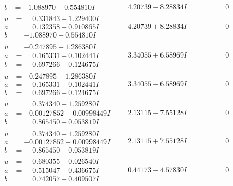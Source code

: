 \documentclass[1p]{elsarticle_modified}
\theoremstyle{definition}
\begin{document}
$$\begin{array}{c|c|c}
\begin{aligned}
b &= -1.088970 - 0.554810 I\end{aligned}
 & \phantom{-}4.20739 - 8.28834 I & \phantom{-0.000000 } 0 \\ \hline\begin{aligned}
u &= \phantom{-}0.331843 - 1.229400 I \\
a &= \phantom{-}0.132358 - 0.910865 I \\
b &= -1.088970 + 0.554810 I\end{aligned}
 & \phantom{-}4.20739 + 8.28834 I & \phantom{-0.000000 } 0 \\ \hline\begin{aligned}
u &= -0.247895 + 1.286380 I \\
a &= \phantom{-}0.165331 + 0.102441 I \\
b &= \phantom{-}0.697266 + 0.124675 I\end{aligned}
 & \phantom{-}3.34055 + 6.58969 I & \phantom{-0.000000 } 0 \\ \hline\begin{aligned}
u &= -0.247895 - 1.286380 I \\
a &= \phantom{-}0.165331 - 0.102441 I \\
b &= \phantom{-}0.697266 - 0.124675 I\end{aligned}
 & \phantom{-}3.34055 - 6.58969 I & \phantom{-0.000000 } 0 \\ \hline\begin{aligned}
u &= \phantom{-}0.374340 + 1.259280 I \\
a &= -0.00127852 + 0.00998449 I \\
b &= \phantom{-}0.865450 + 0.053819 I\end{aligned}
 & \phantom{-}2.13115 - 7.55128 I & \phantom{-0.000000 } 0 \\ \hline\begin{aligned}
u &= \phantom{-}0.374340 - 1.259280 I \\
a &= -0.00127852 - 0.00998449 I \\
b &= \phantom{-}0.865450 - 0.053819 I\end{aligned}
 & \phantom{-}2.13115 + 7.55128 I & \phantom{-0.000000 } 0 \\ \hline\begin{aligned}
u &= \phantom{-}0.680355 + 0.026540 I \\
a &= \phantom{-}0.515047 + 0.436675 I \\
b &= \phantom{-}0.742057 + 0.409507 I\end{aligned}
 & \phantom{-}0.44173 - 4.57830 I & \phantom{-0.000000 } 0 \\ \hline\begin{aligned}

\end{aligned}
\end{array}$$
\end{document}
